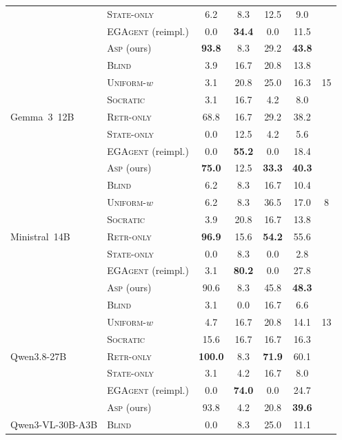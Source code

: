 \documentclass[10pt]{article}
\theoremstyle{definition}
\theoremstyle{plain}
\newcommand{\ASP}{\textsc{Asp}}
\begin{document}
\begin{table}[!htbp]
\begin{tabular}{llcccc@{\hskip 10pt}c}
 & \textsc{State-only} & 6.2 & 8.3 & 12.5 & 9.0 &  \\
 & \textsc{EGAgent} (reimpl.) & 0.0 & \textbf{34.4} & 0.0 & 11.5 &  \\
 & \ASP{} (ours) & \textbf{93.8} & 8.3 & 29.2 & \textbf{43.8} &  \\
\midrule
\multirow{7}{*}{Gemma~3~12B}
 & \textsc{Blind} & 3.9 & 16.7 & 20.8 & 13.8 &  \\
 & \textsc{Uniform-}$w$ & 3.1 & 20.8 & 25.0 & 16.3 & 15 \\
 & \textsc{Socratic} & 3.1 & 16.7 & 4.2 & 8.0 &  \\
 & \textsc{Retr-only} & 68.8 & 16.7 & 29.2 & 38.2 &  \\
 & \textsc{State-only} & 0.0 & 12.5 & 4.2 & 5.6 &  \\
 & \textsc{EGAgent} (reimpl.) & 0.0 & \textbf{55.2} & 0.0 & 18.4 &  \\
 & \ASP{} (ours) & \textbf{75.0} & 12.5 & \textbf{33.3} & \textbf{40.3} &  \\
\midrule
\multirow{7}{*}{Ministral~14B}
 & \textsc{Blind} & 6.2 & 8.3 & 16.7 & 10.4 &  \\
 & \textsc{Uniform-}$w$ & 6.2 & 8.3 & 36.5 & 17.0 & 8 \\
 & \textsc{Socratic} & 3.9 & 20.8 & 16.7 & 13.8 &  \\
 & \textsc{Retr-only} & \textbf{96.9} & 15.6 & \textbf{54.2} & 55.6 &  \\
 & \textsc{State-only} & 0.0 & 8.3 & 0.0 & 2.8 &  \\
 & \textsc{EGAgent} (reimpl.) & 3.1 & \textbf{80.2} & 0.0 & 27.8 &  \\
 & \ASP{} (ours) & 90.6 & 8.3 & 45.8 & \textbf{48.3} &  \\
\midrule
\multirow{7}{*}{Qwen3.8-27B}
 & \textsc{Blind} & 3.1 & 0.0 & 16.7 & 6.6 &  \\
 & \textsc{Uniform-}$w$ & 4.7 & 16.7 & 20.8 & 14.1 & 13 \\
 & \textsc{Socratic} & 15.6 & 16.7 & 16.7 & 16.3 &  \\
 & \textsc{Retr-only} & \textbf{100.0} & 8.3 & \textbf{71.9} & 60.1 &  \\
 & \textsc{State-only} & 3.1 & 4.2 & 16.7 & 8.0 &  \\
 & \textsc{EGAgent} (reimpl.) & 0.0 & \textbf{74.0} & 0.0 & 24.7 &  \\
 & \ASP{} (ours) & 93.8 & 4.2 & 20.8 & \textbf{39.6} &  \\
\midrule
\multirow{7}{*}{Qwen3-VL-30B-A3B}
 & \textsc{Blind} & 0.0 & 8.3 & 25.0 & 11.1 &  \\

\end{tabular}
\end{table}
\end{document}
